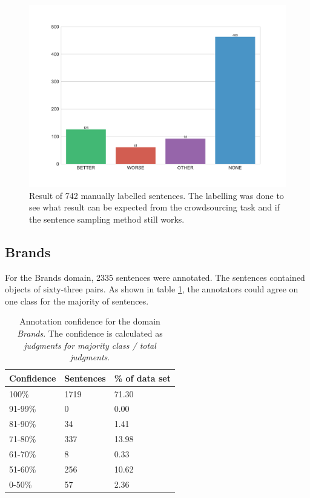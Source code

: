 \begin{figure}[h]
\centering
\caption{Result of 742 manually labelled sentences. The labelling was done to see what result can be expected from the crowdsourcing task and if the sentence sampling method still works.}
\label{fig:sample}
\includegraphics[width=0.8\linewidth]{images/dataset/pre-dist}
\end{figure}
\FloatBarrier
\subsection{Brands}
\label{sec:brands}

For the Brands domain, 2335 sentences were annotated. The sentences contained objects of sixty-three pairs. As shown in table \ref{fig:brand_agg}, the annotators could agree on one class for the majority of sentences.


\begin{table}[h]
\caption{Annotation confidence for the domain \emph{Brands}. The confidence is calculated as \emph{judgments for majority class / total judgments}.}
\label{fig:brand_agg}
\begin{tabularx}{\textwidth}{XXX}
\toprule
Confidence & Sentences & \% of data set \\
\midrule
100\%	&	1719	&	71.30	 \\ 
91-99\%	&	0	&	0.00	 \\ 
81-90\%	&	34	&	1.41	 \\ 
71-80\%	&	337	&	13.98	 \\ 
61-70\%	&	8	&	0.33	 \\ 
51-60\%	&	256	&	10.62	 \\ 
0-50\%	&	57	&	2.36	 \\ 
\bottomrule
\end{tabularx}
\end{table}



